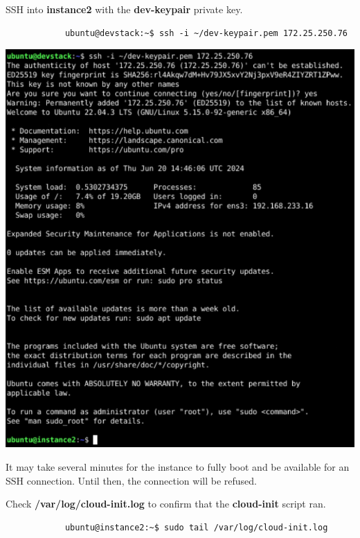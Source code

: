 \documentclass[letterpaper, 12pt]{article}
\begin{document}
\begin{enumerate}
    \begin{labstep}
        SSH into \textbf{instance2} with the \textbf{dev-keypair} private key.
        \begin{lstlisting}
            ubuntu@devstack:~$ ssh -i ~/dev-keypair.pem 172.25.250.76
        \end{lstlisting}

        \begin{center}
            \includegraphics[width=\linewidth]{images/part3/step10.png}
        \end{center}
    \end{labstep}

    \begin{notebox}
        It may take several minutes for the instance to fully boot and be available for an SSH connection.
        Until then, the connection will be refused.
    \end{notebox}

    \begin{labstep}
        Check \textbf{/var/log/cloud-init.log} to confirm that the \textbf{cloud-init} script ran.
        \begin{lstlisting}
            ubuntu@instance2:~$ sudo tail /var/log/cloud-init.log
        \end{lstlisting}


\end{labstep}
\end{enumerate}
\end{document}
